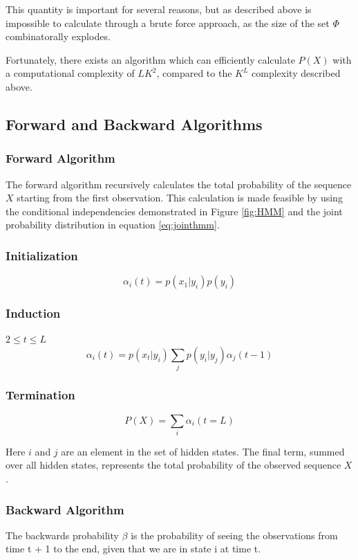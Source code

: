 This quantity is important for several reasons, but as described above is impossible to calculate through a brute force approach, as the size of the set $\Phi$ combinatorally explodes.

Fortunately, there exists an algorithm which can efficiently calculate $P(X)$ with a computational complexity of $LK^2$, compared to the $K^L$ complexity described above.
\subsection{Forward and Backward Algorithms}
\subsubsection{Forward Algorithm}
The forward algorithm recursively calculates the total probability of the sequence $X$ starting from the first observation. This calculation is made feasible by using the conditional independencies demonstrated in Figure \ref{fig:HMM} and the joint probability distribution in equation \ref{eq:jointhmm}.

\subsubsection{Initialization}
\begin{equation}
    \alpha_i(t) = p(x_1|y_i)p(y_i)
\label{eq:fwdinit}
\end{equation}

\subsubsection{Induction}
$2\leq t\leq L$
\begin{equation}
    \alpha_i(t) =p(x_t|y_i)\sum_{j}{p(y_i|y_j)\alpha_j(t-1)}
\label{eq:fwdinduc}
\end{equation}

\subsubsection{Termination}
\begin{equation}
    P(X)= \sum_i{\alpha_i(t=L)}
\label{eq:fwdterm}
\end{equation}

Here $i$ and $j$ are an element in the set of hidden states. The final term, summed over all hidden states, represents the total probability of the observed sequence $X$.

\subsubsection{Backward Algorithm}
The backwards probability $\beta$ is the probability of seeing the observations from time t + 1 to the end, given
that we are in state i at time t.

